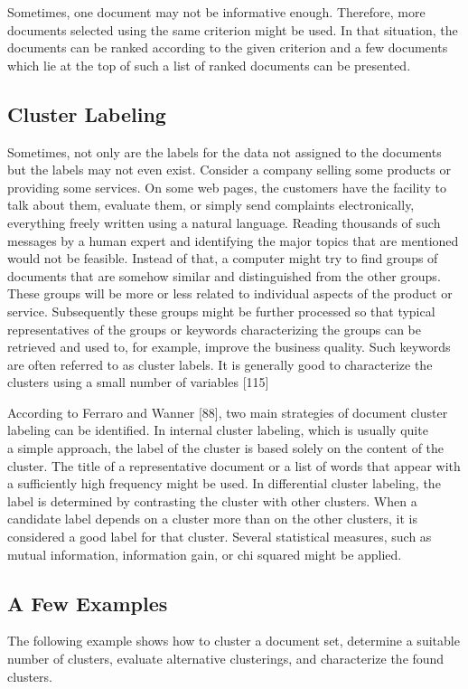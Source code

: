 \documentclass[11pt,openany,executivepaper]{book}
\begin{document}
Sometimes, one document may not be informative enough. Therefore, more documents selected using the same criterion might be used. In that situation, the documents can be ranked according to the given criterion and a few documents which lie at the top of such a list of ranked documents can be presented.

\subsection*{Cluster Labeling}
Sometimes, not only are the labels for the data not assigned to the documents but the labels may not even exist. Consider a company selling some products or providing some services. On some web pages, the customers have the facility to talk about them, evaluate them, or simply send complaints electronically, everything freely written using a natural language. Reading thousands of such messages by a human expert and identifying the major topics that are mentioned would not be feasible. Instead of that, a computer might try to find groups of documents that are somehow similar and distinguished from the other groups. These groups will be more or less related to individual aspects of the product or service. Subsequently these groups might be further processed so that typical representatives of the groups or keywords characterizing the groups can be retrieved and used to, for example, improve the business quality. Such keywords are often referred to as cluster labels. It is generally good to characterize the clusters using a small number of variables [115]

According to Ferraro and Wanner [88], two main strategies of document cluster labeling can be identified. In internal cluster labeling, which is usually quite\\
a simple approach, the label of the cluster is based solely on the content of the cluster. The title of a representative document or a list of words that appear with a sufficiently high frequency might be used. In differential cluster labeling, the label is determined by contrasting the cluster with other clusters. When a candidate label depends on a cluster more than on the other clusters, it is considered a good label for that cluster. Several statistical measures, such as mutual information, information gain, or chi squared might be applied.

\subsection*{A Few Examples}
The following example shows how to cluster a document set, determine a suitable number of clusters, evaluate alternative clusterings, and characterize the found clusters.
\end{document}
